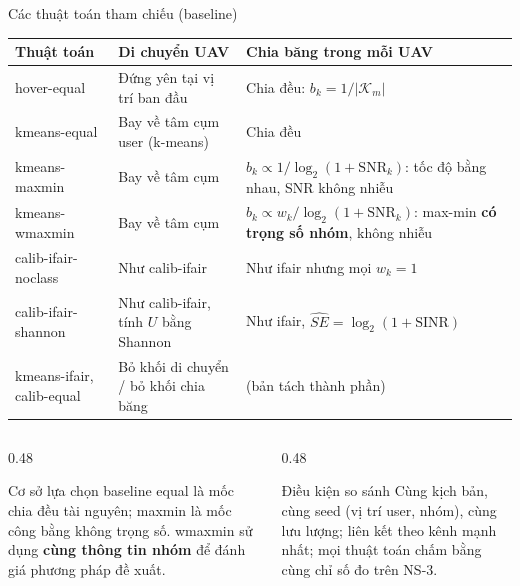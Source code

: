 \documentclass[aspectratio=169,10pt,t]{beamer}
\newcommand{\hl}[1]{\textcolor{MainBlue}{\textbf{#1}}}
\begin{document}
\begin{frame}{Các thuật toán tham chiếu (baseline)}
\small
\begin{tabularx}{\linewidth}{@{}lXX@{}}
  \toprule
  \textbf{Thuật toán} & \textbf{Di chuyển UAV} & \textbf{Chia băng trong mỗi UAV}\\
  \midrule
  hover-equal & Đứng yên tại vị trí ban đầu & Chia đều: $b_k = 1/|\mathcal{K}_m|$\\
  kmeans-equal & Bay về tâm cụm user (k-means) & Chia đều\\
  kmeans-maxmin & Bay về tâm cụm & $b_k \propto 1/\log_2(1+\mathrm{SNR}_k)$: tốc độ bằng nhau, SNR \alert{không nhiễu}\\
  kmeans-wmaxmin & Bay về tâm cụm & $b_k \propto w_k/\log_2(1+\mathrm{SNR}_k)$: max-min \hl{có trọng số nhóm}, không nhiễu\\
  \midrule
  calib-ifair-noclass & Như calib-ifair & Như ifair nhưng mọi $w_k = 1$\\
  calib-ifair-shannon & Như calib-ifair, tính $U$ bằng Shannon & Như ifair, $\widehat{SE} = \log_2(1+\mathrm{SINR})$\\
  kmeans-ifair, calib-equal & Bỏ khối di chuyển / bỏ khối chia băng & (bản tách thành phần)\\
  \bottomrule
\end{tabularx}
\vspace{2mm}
\begin{columns}[T,onlytextwidth]
\begin{column}{0.48\textwidth}
\vspace{0pt}
  \begin{block}{Cơ sở lựa chọn baseline}
    \scriptsize
    equal là mốc chia đều tài nguyên; maxmin là mốc công bằng không trọng số.
    wmaxmin sử dụng \textbf{cùng thông tin nhóm} để đánh giá phương pháp đề xuất.
  \end{block}
\end{column}
\begin{column}{0.48\textwidth}
\vspace{0pt}
  \begin{block}{Điều kiện so sánh}
    \scriptsize
    Cùng kịch bản, cùng seed (vị trí user, nhóm), cùng lưu lượng; liên kết theo kênh mạnh nhất; mọi thuật toán chấm bằng cùng chỉ số đo trên NS-3.
  \end{block}
\end{column}
\end{columns}
\end{frame}
\end{document}
